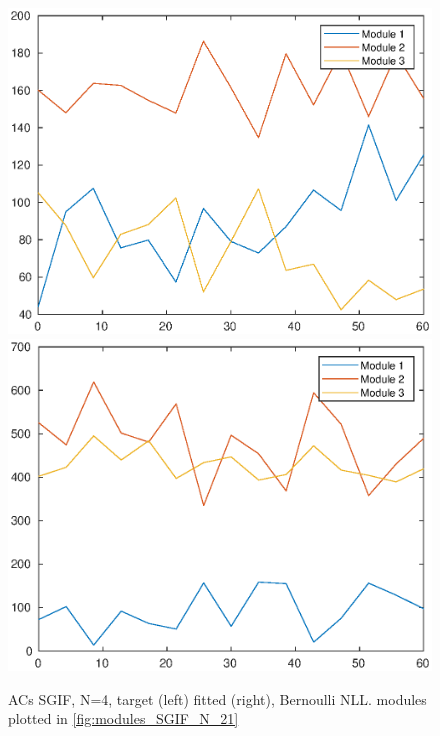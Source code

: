 \documentclass[mphil,deptreport,ianc]{infthesis} %
\begin{document}
\begin{figure}
    \includegraphics[width=0.49\columnwidth]{figures/matlab/NMF/ACs_target_GT_model_microGIF_N_21.eps}
    \includegraphics[width=0.49\columnwidth]{figures/matlab/NMF/ACs_nuovo_synthetic_v2_spikes_mt_microGIF_lfn_bernoulli_nll_euid_01-01_15-56-11-305.eps}
    \caption{ACs SGIF, N=4, target (left) fitted (right), Bernoulli NLL. modules plotted in \ref{fig:modules_SGIF_N_21}}
    \label{fig:ACs_SGIF_N_21}
\end{figure}
\end{document}
